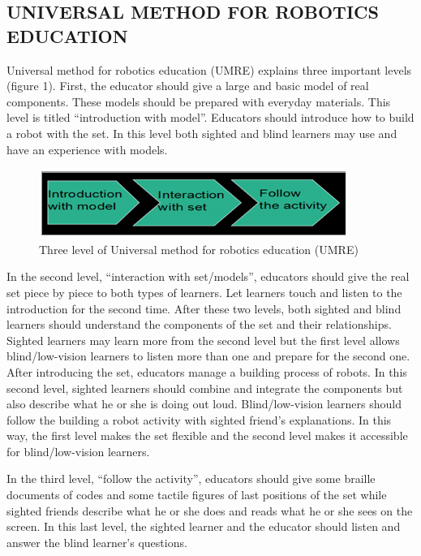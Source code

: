 \documentclass[11.5pt]{sig-alternate} %
\begin{document}
\begin{large}
\section*{UNIVERSAL METHOD FOR ROBOTICS EDUCATION}
 
Universal method for robotics education (UMRE) explains three important levels (figure 1).  First, the educator should give a large and basic model of real components.  These models should be prepared with everyday materials.  This level is titled “introduction with model”. Educators should introduce how to build a robot with the set.  In this level both sighted and blind learners may use and have an experience with models.
 
\begin{figure}[ht]
     \centering
     \includegraphics[width=1\linewidth]{fig1.png}
     \caption{Three level of Universal method for robotics education (UMRE)}
 \end{figure} 

In the second level, “interaction with set/models”, educators should give the real set piece by piece to both types of learners.  Let learners touch and listen to the introduction for the second time.  After these two levels, both sighted and blind learners should understand the components of the set and their relationships.  Sighted learners may learn more from the second level but the first level allows blind/low-vision learners to listen more than one and prepare for the second one.  After introducing the set, educators manage a building process of robots.  In this second level, sighted learners should combine and integrate the components but also describe what he or she is doing out loud.  Blind/low-vision learners should follow the building a robot activity with sighted friend’s explanations.  In this way, the first level makes the set flexible and the second level makes it accessible for blind/low-vision learners. 

In the third level, “follow the activity”, educators should give some braille documents of codes and some tactile figures of last positions of the set while sighted friends describe what he or she does and reads what he or she sees on the screen.  In this last level, the sighted learner and the educator should listen and answer the blind learner’s questions. 


\end{large}
\end{document}
